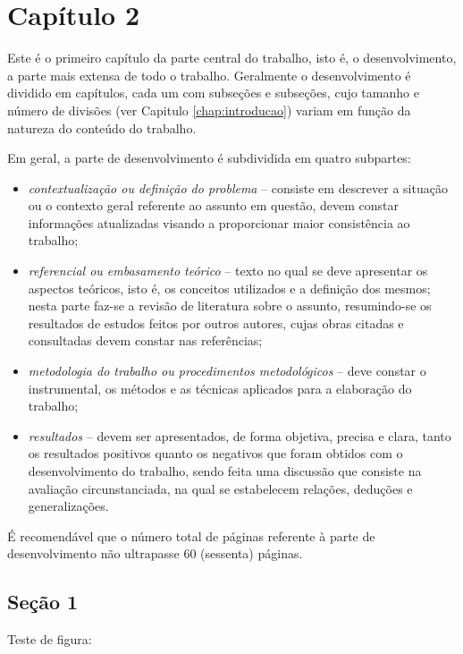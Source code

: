 \chapter{Capítulo 2}

Este é o primeiro capítulo da parte central do trabalho, isto é, o
desenvolvimento, a parte mais extensa de todo o trabalho. Geralmente o
desenvolvimento é dividido em capítulos, cada um com subseções e subseções,
cujo tamanho e número de divisões (ver Capitulo \ref{chap:introducao}) variam em função da natureza do conteúdo do
trabalho.

Em geral, a parte de desenvolvimento é subdividida em quatro subpartes:

\begin{itemize}
   \item \textit{contextualização ou definição do problema} -- consiste em
   descrever a situação ou o contexto geral referente ao assunto em questão,
   devem constar informações atualizadas visando a proporcionar maior
   consistência ao trabalho;
   \item \textit{referencial ou embasamento teórico} -- texto no qual se deve
   apresentar os aspectos teóricos, isto é, os conceitos utilizados e a
   definição dos mesmos; nesta parte faz-se a revisão de literatura sobre o
   assunto, resumindo-se os resultados de estudos feitos por outros autores,
   cujas obras citadas e consultadas devem constar nas referências;
   \item \textit{metodologia do trabalho ou procedimentos metodológicos} -- deve
   constar o instrumental, os métodos e as técnicas aplicados para a elaboração
   do trabalho;
   \item \textit{resultados} -- devem ser apresentados, de forma objetiva,
   precisa e clara, tanto os resultados positivos quanto os negativos que foram
   obtidos com o desenvolvimento do trabalho, sendo feita uma discussão que
   consiste na avaliação circunstanciada, na qual se estabelecem relações,
   deduções e generalizações.
\end{itemize}

É recomendável que o número total de páginas referente à parte de
 desenvolvimento não ultrapasse 60 (sessenta) páginas.

\section{Seção 1}

Teste de figura:

